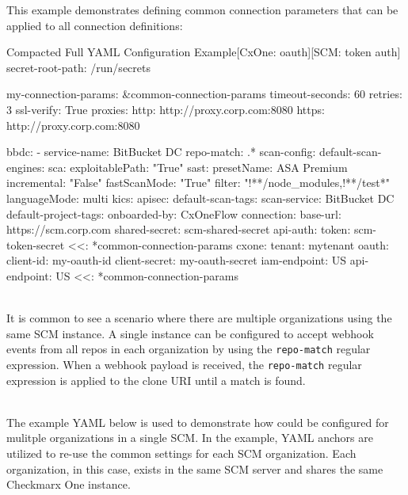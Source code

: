 This example demonstrates defining common connection parameters that can be applied
to all connection definitions:


\begin{code}{Compacted Full YAML Configuration Example}{[CxOne: oauth]}{[SCM: token auth]}
secret-root-path: /run/secrets

my-connection-params: &common-connection-params
    timeout-seconds: 60
    retries: 3
    ssl-verify: True
    proxies:
    http: http://proxy.corp.com:8080
    https: http://proxy.corp.com:8080


bbdc:
    - service-name: BitBucket DC
      repo-match: .*
      scan-config:
          default-scan-engines:
              sca:
                  exploitablePath: "True"
              sast:
                  presetName: ASA Premium
                  incremental: "False"
                  fastScanMode: "True"
                  filter: "!**/node_modules,!**/test*"
                  languageMode: multi
              kics:
              apisec:
          default-scan-tags:
              scan-service: BitBucket DC
          default-project-tags:
              onboarded-by: CxOneFlow
      connection:
          base-url: https://scm.corp.com
          shared-secret: scm-shared-secret
          api-auth:
              token: scm-token-secret
          <<: *common-connection-params
      cxone:
          tenant: mytenant
          oauth:
              client-id: my-oauth-id
              client-secret: my-oauth-secret
          iam-endpoint: US
          api-endpoint: US
          <<: *common-connection-params
\end{code}


\noindent\\It is common to see a scenario where there are multiple organizations
using the same SCM instance.  A single \cxoneflow instance can be configured to accept
webhook events from all repos in each organization by using the \texttt{repo-match}
regular expression.  When a webhook payload is received, the \texttt{repo-match}
regular expression is applied to the clone URI until a match is found.

\noindent\\The example YAML below is used to demonstrate how \cxoneflow could be configured
for mulitple organizations in a single SCM. In the example, YAML anchors are utilized to 
re-use the common settings for each SCM organization.  Each organization, in this case, 
exists in the same SCM server and shares the same Checkmarx One instance.

